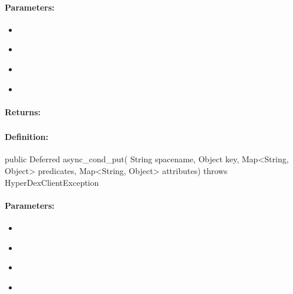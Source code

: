 \paragraph{Parameters:}
\begin{itemize}[noitemsep]
\item {}\\

\item {}\\

\item {}\\

\item {}\\

\end{itemize}

\paragraph{Returns:}


\pagebreak
\subsubsection{}
\label{api:java:async_cond_put}


\paragraph{Definition:}
\begin{javacode}
public Deferred async_cond_put(
        String spacename,
        Object key,
        Map<String, Object> predicates,
        Map<String, Object> attributes) throws HyperDexClientException
\end{javacode}

\paragraph{Parameters:}
\begin{itemize}[noitemsep]
\item {}\\

\item {}\\

\item {}\\

\item {}\\

\end{itemize}

